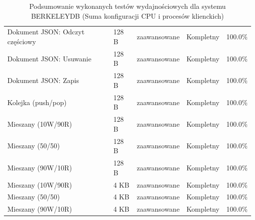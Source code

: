 \begin{table}[ht]
{\begin{tabular}{lllcc}
Dokument JSON: Odczyt częściowy & 128 B & zaawansowane & Kompletny & 100.0\% \\
Dokument JSON: Usuwanie & 128 B & zaawansowane & Kompletny & 100.0\% \\
Dokument JSON: Zapis & 128 B & zaawansowane & Kompletny & 100.0\% \\
Kolejka (push/pop) & 128 B & zaawansowane & Kompletny & 100.0\% \\
Mieszany (10W/90R) & 128 B & zaawansowane & Kompletny & 100.0\% \\
Mieszany (50/50) & 128 B & zaawansowane & Kompletny & 100.0\% \\
Mieszany (90W/10R) & 128 B & zaawansowane & Kompletny & 100.0\% \\
Mieszany (10W/90R) & 4 KB & zaawansowane & Kompletny & 100.0\% \\
Mieszany (50/50) & 4 KB & zaawansowane & Kompletny & 100.0\% \\
Mieszany (90W/10R) & 4 KB & zaawansowane & Kompletny & 100.0\% \\
\bottomrule
\end{tabular}%
}
\caption{Podsumowanie wykonanych testów wydajnościowych dla systemu BERKELEYDB (Suma konfiguracji CPU i procesów klienckich)}
\label{tab:executed_tests_berkeleydb}
\end{table}
